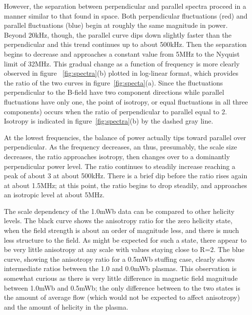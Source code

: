 \documentclass[aip,prl,amsmath,amssymb,reprint,superscriptaddress]{revtex4-1} %
\begin{document}
However, the separation between perpendicular and parallel spectra proceed in a manner similar to that found in space. Both perpendicular fluctuations (red) and parallel fluctuations (blue) begin at roughly the same magnitude in power. Beyond 20kHz, though, the parallel curve dips down slightly faster than the perpendicular and this trend continues up to about 500kHz. Then the separation begins to decrease and approaches a constant value from 5MHz to the Nyquist limit of 32MHz. This gradual change as a function of frequency is more clearly observed in figure ~\ref{fig:spectra}(b) plotted in log-linear format, which provides the ratio of the two curves in figure~\ref{fig:specta}(a). Since the fluctuations perpendicular to the B-field have two component directions while parallel fluctuations have only one, the point of isotropy, or equal fluctuations in all three components) occurs when the ratio of perpendicular to parallel equal to 2. Isotropy is indicated in figure~\ref{fig:spectra}(b) by the dashed gray line.

At the lowest frequencies, the balance of power actually tips toward parallel over perpendicular. As the frequency decreases, an thus, presumably, the scale size decreases, the ratio approaches isotropy, then changes over to a dominantly perpendicular power level. The ratio continues to steadily increase reaching a peak of about 3 at about 500kHz. There is a brief dip before the ratio rises again at about 1.5MHz; at this point, the ratio begins to drop steadily, and approaches an isotropic level at about 5MHz. 

The scale dependency of the 1.0mWb data can be compared to other helicity levels. The black curve shows the anisotropy ratio for the zero helicity state, when the field strength is about an order of magnitude less, and there is much less structure to the field. As might be expected for such a state, there appear to be very little anisotropy at any scale with values staying close to R=2. The blue curve, showing the anisotropy ratio for a 0.5mWb stuffing case, clearly shows intermediate ratios between the 1.0 and 0.0mWb plasmas. This observation is somewhat curious as there is very little difference in magnetic field magnitude between 1.0mWb and 0.5mWb; the only difference between to the two states is the amount of average flow (which would not be expected to affect anisotropy) and the amount of helicity in the plasma.
\end{document}
